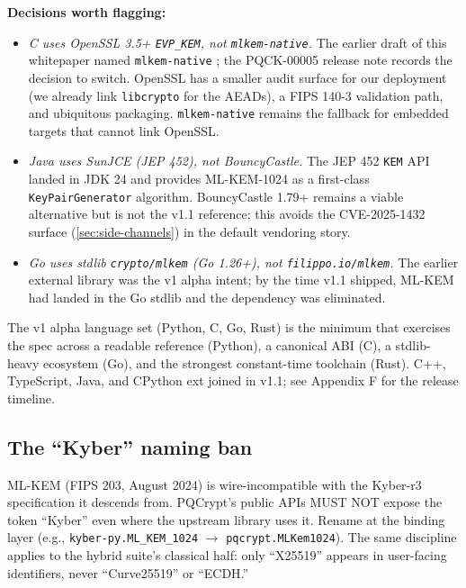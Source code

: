 \textbf{Decisions worth flagging:}
\begin{itemize}
\item \emph{C uses OpenSSL 3.5+ \texttt{EVP\_KEM}, not \texttt{mlkem-native}.} The earlier draft of this whitepaper named \texttt{mlkem-native} \citep{cryspen2025mlkem}; the PQCK-00005 release note records the decision to switch. OpenSSL has a smaller audit surface for our deployment (we already link \texttt{libcrypto} for the AEADs), a FIPS 140-3 validation path, and ubiquitous packaging. \texttt{mlkem-native} remains the fallback for embedded targets that cannot link OpenSSL.
\item \emph{Java uses SunJCE (JEP 452), not BouncyCastle.} The JEP 452 \texttt{KEM} API landed in JDK 24 and provides ML-KEM-1024 as a first-class \texttt{KeyPairGenerator} algorithm. BouncyCastle 1.79+ remains a viable alternative but is not the v1.1 reference; this avoids the CVE-2025-1432 surface (\cref{sec:side-channels}) in the default vendoring story.
\item \emph{Go uses stdlib \texttt{crypto/mlkem} (Go 1.26+), not \texttt{filippo.io/mlkem}.} The earlier external library was the v1 alpha intent; by the time v1.1 shipped, ML-KEM had landed in the Go stdlib and the dependency was eliminated.
\end{itemize}

The v1 alpha language set (Python, C, Go, Rust) is the minimum that exercises the spec across a readable reference (Python), a canonical ABI (C), a stdlib-heavy ecosystem (Go), and the strongest constant-time toolchain (Rust). C++, TypeScript, Java, and CPython ext joined in v1.1; see Appendix F for the release timeline.

\subsection{The ``Kyber'' naming ban}

ML-KEM (FIPS 203, August 2024) is wire-incompatible with the Kyber-r3 specification it descends from. PQCrypt's public APIs MUST NOT expose the token ``Kyber'' even where the upstream library uses it. Rename at the binding layer (e.g., \texttt{kyber-py.ML\_KEM\_1024} $\to$ \texttt{pqcrypt.MLKem1024}). The same discipline applies to the hybrid suite's classical half: only ``X25519'' appears in user-facing identifiers, never ``Curve25519'' or ``ECDH.''
